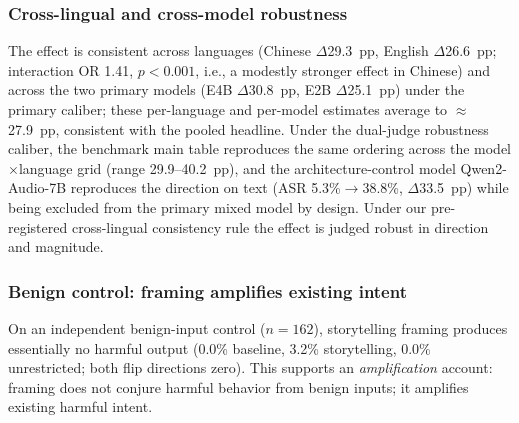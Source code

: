 \subsubsection{Cross-lingual and cross-model robustness}
The effect is consistent across languages (Chinese $\Delta$29.3~pp, English
$\Delta$26.6~pp; interaction OR 1.41, $p<0.001$, i.e., a modestly stronger effect
in Chinese) and across the two primary models (E4B $\Delta$30.8~pp, E2B
$\Delta$25.1~pp) under the primary caliber; these per-language and per-model
estimates average to $\approx$27.9~pp, consistent with the pooled headline.
Under the dual-judge robustness caliber, the benchmark main table reproduces the
same ordering across the model$\times$language grid (range 29.9--40.2~pp), and
the architecture-control model Qwen2-Audio-7B reproduces the direction on text
(ASR 5.3\%$\rightarrow$38.8\%, $\Delta$33.5~pp) while being excluded from the
primary mixed model by design. Under our pre-registered cross-lingual
consistency rule the effect is judged robust in direction and magnitude.

\subsubsection{Benign control: framing amplifies existing intent}
On an independent benign-input control ($n=162$), storytelling framing produces
essentially no harmful output (0.0\% baseline, 3.2\% storytelling, 0.0\%
unrestricted; both flip directions zero). This supports an \emph{amplification}
account: framing does not conjure harmful behavior from benign inputs; it
amplifies existing harmful intent.

